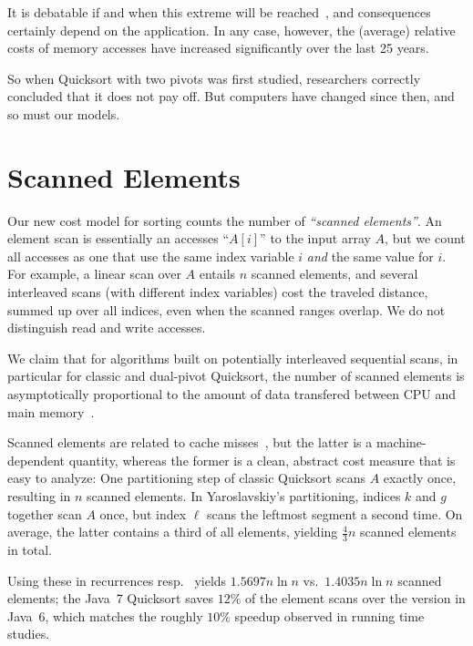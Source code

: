 \documentclass[]{theotage}
\begin{document}
It is debatable if and when this extreme will be reached~\cite{Ertl2001,McKee2004},
and consequences certainly depend on the application.
In any case, however, the (average) relative costs of memory accesses
have increased significantly over the last 25 years.

So when Quicksort with two pivots was first studied, 
researchers correctly concluded that it does not pay off.
But computers have changed since then, and so must our models.


\section{Scanned Elements}
\label{sec:scanned-elements}

Our new cost model for sorting counts the number of \emph{``scanned elements''}.
An element scan is essentially an accesses ``$A[i]$'' to the input array $A$, 
but we count all accesses as one that
use the same index variable $i$ \emph{and} the same value for $i$.
For example, a linear scan over $A$ entails $n$ scanned elements, 
and several interleaved scans 
(with different index variables) cost the traveled distance, 
summed up over all indices, even when the scanned ranges overlap.
We do not distinguish read and write accesses.

We claim that for algorithms built on potentially interleaved sequential scans, 
in particular for classic and dual-pivot Quicksort,
the number of scanned elements is asymptotically proportional 
to the amount of data transfered between CPU and main memory~\cite{MartinezNebelWild2015aofaFullPaper}.

Scanned elements are related to cache misses~\cite{Kushagra2014}, 
but the latter is a machine-dependent quantity, 
whereas the former is a clean, abstract cost measure that is easy to analyze:
One partitioning step of classic Quicksort scans $A$ exactly once, resulting in $n$ scanned
elements.
In Yaroslavskiy's partitioning, indices $k$ and $g$ together scan $A$ once, but index $\ell$ 
scans the leftmost segment a second time.
On average, the latter contains a third of all elements, yielding $\frac43 n$ 
scanned elements in total.

Using these in recurrences  resp.\  
yields $1.5697 n\ln n$ vs.\ $1.4035 n\ln n$ scanned elements;
the Java~7 Quicksort saves $12\%$ of the element scans over the version in
Java~6, which matches the roughly $10\%$ speedup observed in running time studies.
\end{document}
